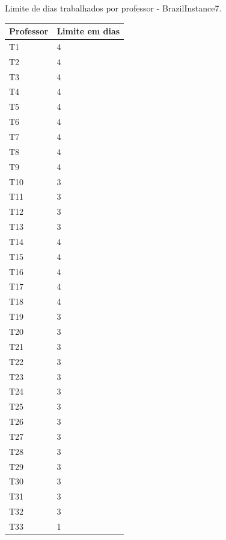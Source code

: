 \begin{quadro}[h]
	\centering
	\caption{Limite de dias trabalhados por professor - BrazilInstance7.\label{qua:limites_dias_trabalhados_brazilinstance7}}
	\begin{tabular}{|p{2cm}|p{4cm}|}
		\hline
		\textbf{Professor} & \textbf{Limite em dias} \\
		\hline
		T1 & 4 \\
		\hline
		T2 & 4 \\
		\hline
		T3 & 4 \\
		\hline
		T4 & 4 \\
		\hline
		T5 & 4 \\
		\hline
		T6 & 4 \\
		\hline
		T7 & 4 \\
		\hline
		T8 & 4 \\
		\hline
		T9 & 4 \\
		\hline
		T10 & 3 \\
		\hline
		T11 & 3 \\
		\hline
		T12 & 3 \\
		\hline
		T13 & 3 \\
		\hline
		T14 & 4 \\
		\hline
		T15 & 4 \\
		\hline
		T16 & 4 \\
		\hline
		T17 & 4 \\
		\hline
		T18 & 4 \\
		\hline
		T19 & 3 \\
		\hline
		T20 & 3 \\
		\hline
		T21 & 3 \\
		\hline
		T22 & 3 \\
		\hline
		T23 & 3 \\
		\hline
		T24 & 3 \\
		\hline
		T25 & 3 \\
		\hline
		T26 & 3 \\
		\hline
		T27 & 3 \\
		\hline
		T28 & 3 \\
		\hline
		T29 & 3 \\
		\hline
		T30 & 3 \\
		\hline
		T31 & 3 \\
		\hline
		T32 & 3 \\
		\hline
		T33 & 1 \\
		\hline
	\end{tabular}
\end{quadro}

